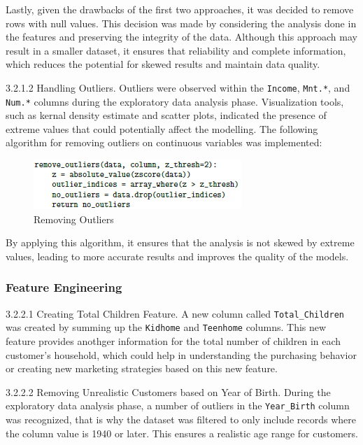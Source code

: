     Lastly, given the drawbacks of the first two approaches, it was decided to remove rows with null values. This decision was made by considering the analysis done in the features and preserving the integrity of the data. Although this approach may result in a smaller dataset, it ensures that reliability and complete information, which reduces the potential for skewed results and maintain data quality.

    3.2.1.2 Handling Outliers. Outliers were observed within the \texttt{Income}, \texttt{Mnt.*}, and \texttt{Num.*} columns during the exploratory data analysis phase. Visualization tools, such as kernal density estimate and scatter plots, indicated the presence of extreme values that could potentially affect the modelling. The following algorithm for removing outliers on continuous variables was implemented:

\begin{figure}[H]
    \centering
    \includegraphics[width=\linewidth]{figures/removing_outliers.png}
    \caption{Removing Outliers}
\end{figure}

    By applying this algorithm, it ensures that the analysis is not skewed by extreme values, leading to more accurate results and improves the quality of the models.

\subsubsection{Feature Engineering}

    3.2.2.1 Creating Total Children Feature. A new column called \texttt{Total\_Children} was created by summing up the \texttt{Kidhome} and \texttt{Teenhome} columns. This new feature provides anothger information for the total number of children in each customer's household, which could help in understanding the purchasing behavior or creating new marketing strategies based on this new feature.

    3.2.2.2 Removing Unrealistic Customers based on Year of Birth. During the exploratory data analysis phase, a number of outliers in the \texttt{Year\_Birth} column was recognized, that is why the dataset was filtered to only include records where the column value is 1940 or later. This ensures a realistic age range for customers.

